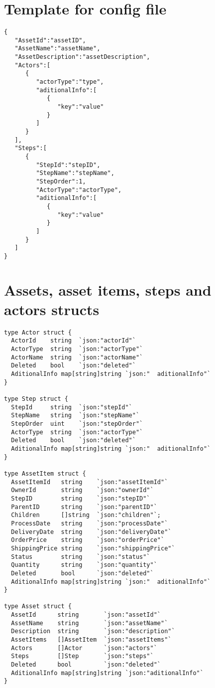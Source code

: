 \section{Template for config file}{} %
\label{app:template}

\begin{verbatim}
{
   "AssetId":"assetID",
   "AssetName":"assetName",
   "AssetDescription":"assetDescription",
   "Actors":[
      {
         "actorType":"type",
         "aditionalInfo":[
            {
               "key":"value"
            }
         ]
      }
   ],
   "Steps":[
      {
         "StepId":"stepID",
         "StepName":"stepName",
         "StepOrder":1,
         "ActorType":"actorType",
         "aditionalInfo":[
            {
               "key":"value"
            }
         ]
      }
   ]
}
\end{verbatim}

\section{Assets, asset items, steps and actors structs}{} %
\label{app:structs}


\begin{verbatim}
type Actor struct {
  ActorId    string  `json:"actorId"`
  ActorType  string  `json:"actorType"`
  ActorName  string  `json:"actorName"`
  Deleted    bool    `json:"deleted"`
  AditionalInfo map[string]string `json:"  aditionalInfo"`
}

type Step struct {
  StepId     string  `json:"stepId"`
  StepName   string  `json:"stepName"`
  StepOrder  uint    `json:"stepOrder"`
  ActorType  string  `json:"actorType"`
  Deleted    bool    `json:"deleted"`
  AditionalInfo map[string]string `json:"  aditionalInfo"`
}

type AssetItem struct {
  AssetItemId   string    `json:"assetItemId"`
  OwnerId       string    `json:"ownerId"`
  StepID        string    `json:"stepID"`
  ParentID      string    `json:"parentID"`
  Children      []string  `json:"children"`;
  ProcessDate   string    `json:"processDate"`
  DeliveryDate  string    `json:"deliveryDate"`
  OrderPrice    string    `json:"orderPrice"`
  ShippingPrice string    `json:"shippingPrice"`
  Status        string    `json:"status"`
  Quantity      string    `json:"quantity"`
  Deleted       bool      `json:"deleted"`
  AditionalInfo map[string]string `json:"  aditionalInfo"`
}

type Asset struct {
  AssetId      string       `json:"assetId"`
  AssetName    string       `json:"assetName"`
  Description  string       `json:"description"`
  AssetItems   []AssetItem  `json:"assetItems"`
  Actors       []Actor      `json:"actors"`
  Steps        []Step       `json:"steps"`
  Deleted      bool         `json:"deleted"`
  AditionalInfo map[string]string `json:"aditionalInfo"`
}
\end{verbatim}

